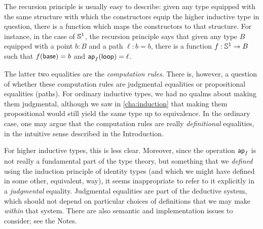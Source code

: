 %
%
The recursion principle is usually easy to describe: given any type equipped with the same structure with which the constructors equip the higher inductive type in question, there is a function which maps the constructors to that structure.
For instance, in the case of $\mathbb{S}^1$, the recursion principle says that given any type $B$ equipped with a point $b:B$ and a path $\ell:b=b$, there is a function $f:\mathbb{S}^1\to B$ such that $f(\mathsf{base})=b$ and $\mathsf{ap}_{f} (\mathsf{loop}) = \ell$.

%
%
The latter two equalities are the \emph{computation rules}.
%
%
There is, however, a question of whether these computation rules are judgmental equalities or propositional equalities (paths).
For ordinary inductive types, we had no qualms about making them judgmental, although we saw in \cref{cha:induction} that making them propositional would still yield the same type up to equivalence.
In the ordinary case, one may argue that the computation rules are really \emph{definitional} equalities, in the intuitive sense described in the Introduction.

%
For higher inductive types, this is less clear. %
Moreover, since the operation $\mathsf{ap}_{f}$ is not really a fundamental part of the type theory, but something that we \emph{defined} using the induction principle of identity types (and which we might have defined in some other, equivalent, way), it seems inappropriate to refer to it explicitly in a \emph{judgmental} equality.
Judgmental equalities are part of the deductive system, which should not depend on particular choices of definitions that we may make \emph{within} that system.
There are also semantic and implementation issues to consider; see the Notes.

